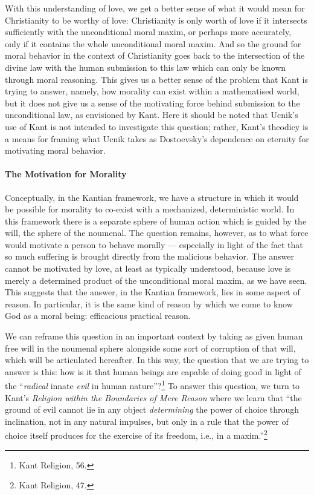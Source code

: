 \documentclass[12pt]{article}
\begin{document}
	With this understanding of love, we get a better sense of what it would mean for Christianity to be worthy of love: Christianity is only worth of love if it intersects sufficiently with the unconditional moral maxim, or perhaps more accurately, only if it contains the whole unconditional moral maxim. And so the ground for moral behavior in the context of Christianity goes back to the intersection of the divine law with the human submission to this law which can only be known through moral reasoning. This gives us a better sense of the problem that Kant is trying to answer, namely, how morality can exist within a mathematised world, but it does not give us a sense of the motivating force behind submission to the unconditional law, as envisioned by Kant. Here it should be noted that Ucnik's use of Kant is not intended to investigate this question; rather, Kant's theodicy is a means for framing what Ucnik takes as Dostoevsky's dependence on eternity for motivating moral behavior. 
	
	\paragraph*{The Motivation for Morality} Conceptually, in the Kantian framework, we have a structure in which it would be possible for morality to co-exist with a mechanized, deterministic world. In this framework there is a separate sphere of human action which is guided by the will, the sphere of the noumenal. The question remains, however, as to what force would motivate a person to behave morally --- especially in light of the fact that so much suffering is brought directly from the malicious behavior. The answer cannot be motivated by love, at least as typically understood, because love is merely a determined product of the unconditional moral maxim, as we have seen. This suggests that the answer, in the Kantian framework, lies in some aspect of reason. In particular, it is the same kind of reason by which we come to know God as a moral being: efficacious practical reason.
	
	We can reframe this question in an important context by taking as given human free will in the noumenal sphere alongside some sort of corruption of that will, which will be articulated hereafter. In this way, the question that we are trying to answer is this: how is it that human beings are capable of doing good in light of the ``\emph{radical} innate \emph{evil} in human nature''?\footnote{Kant Religion, 56.} To answer this question, we turn to Kant's \emph{Religion within the Boundaries of Mere Reason} where we learn that ``the ground of evil cannot lie in any object \emph{determining} the power of choice through inclination, not in any natural impulses, but only in a rule that the power of choice itself produces for the exercise of its freedom, i.e., in a maxim.''\footnote{Kant Religion, 47.}
\end{document}

